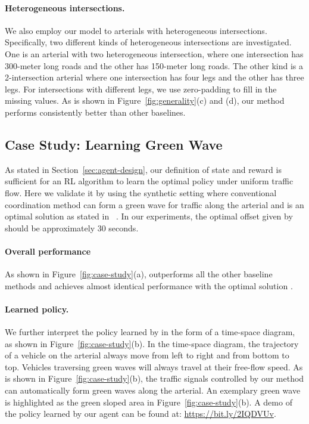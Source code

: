 \paragraph{Heterogeneous intersections.} We also employ our model to arterials with heterogeneous intersections. Specifically, two different kinds of heterogeneous intersections are investigated. One is an arterial with two heterogeneous intersection, where one intersection has 300-meter long roads and the other has 150-meter long roads. The other kind is a 2-intersection arterial where one intersection has four legs and the other has three legs. For intersections with different legs, we use zero-padding to fill in the missing values. As is shown in Figure~\ref{fig:generality}(c) and (d), our method performs consistently better than other baselines. 

\subsection{Case Study: Learning Green Wave}
As stated in Section~\ref{sec:agent-design}, our definition of state and reward is sufficient for an RL algorithm to learn the optimal policy under uniform traffic flow. Here we validate it by using the synthetic setting where conventional coordination method \Greenwave can form a green wave for traffic along the arterial and is an optimal solution as stated in ~\cite{Roess2011t}. In our experiments, the optimal offset given by \Greenwave should be approximately 30 seconds. 

\paragraph{Overall performance}
As shown in Figure~\ref{fig:case-study}(a), \MTDeeplight outperforms all the other baseline methods
and achieves almost identical performance with the optimal solution \Greenwave.

\paragraph{Learned policy.}
We further interpret the policy learned by \MTDeeplight in the form of a time-space diagram, as shown in Figure~\ref{fig:case-study}(b). 
In the time-space diagram, the trajectory of a vehicle on the arterial always move from left to right and from bottom to top. Vehicles traversing green waves will always travel at their free-flow speed. As is shown in Figure~\ref{fig:case-study}(b), the traffic signals controlled by our method can automatically form green waves along the arterial. An exemplary green wave is highlighted as the green sloped area in Figure~\ref{fig:case-study}(b). A demo of the policy learned by our agent can be found at: \url{https://bit.ly/2IQDVUv}.


